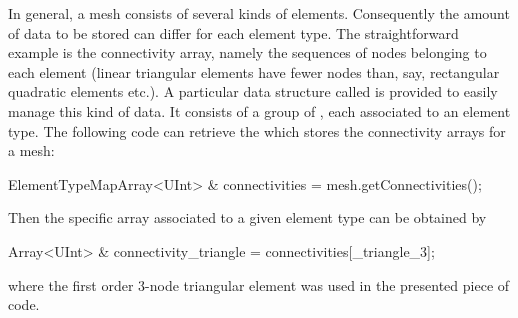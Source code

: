 In general, a mesh consists of several kinds of elements.
Consequently the amount of data to be stored can differ for each element type.
The straightforward example is the connectivity array, namely the sequences of nodes belonging to each element (linear triangular elements have fewer nodes than, say, rectangular quadratic elements etc.).
A particular data structure called  is provided to easily manage this kind of data.
It consists of a group of , each associated to an element type.
The following code can retrieve the  which stores the connectivity arrays for a mesh:
\begin{cpp}
  ElementTypeMapArray<UInt> & connectivities = mesh.getConnectivities();
\end{cpp}
Then the specific array associated to a given element type can be obtained by
\begin{cpp}
  Array<UInt> & connectivity_triangle = connectivities[_triangle_3];
\end{cpp}
where the first order 3-node triangular element was used in the presented piece
of code.


